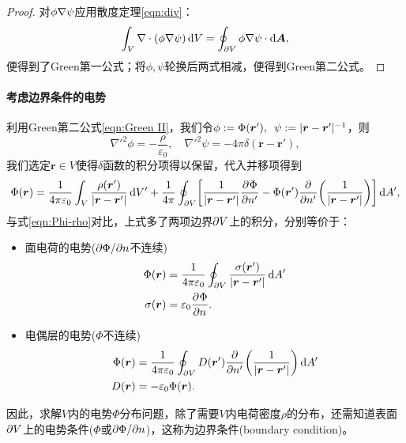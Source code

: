 \begin{proof}
    对$\phi\nabla\psi$应用散度定理\eqref{eqn:div}：
    \[
        \int_V\nabla\cdot(\phi\nabla\psi)\mathop{}\!\mathrm{d} V = \oint_{\partial V}\phi\nabla\psi \cdot \mathop{}\!\mathrm{d}\bm A,
    \]
    便得到了Green第一公式；将$\phi,\psi$轮换后两式相减，便得到Green第二公式。
\end{proof}

\paragraph{考虑边界条件的电势}

利用Green第二公式\eqref{eqn:Green II}，我们令$\phi := \Phi(\bm r'),\enspace\psi := \lvert\bm r - \bm r'\rvert^{-1}$，则
\[
    \nabla'^2\phi = -\frac{\rho}{\varepsilon_0},\quad\nabla'^2\psi = -4\pi\delta(\bm r - \bm r'),
\]
我们选定$\bm r \in V$使得$\delta$函数的积分项得以保留，代入并移项得到
\begin{equation}
    \label{eqn:Phi-rho with boundary}
        \Phi(\bm r) = \frac1{4\pi\varepsilon_0}\int_V\frac{\rho(\bm r')}{\lvert\bm r - \bm r'\rvert}\mathop{}\!\mathrm{d} V' + \frac1{4\pi}\oint_{\partial V}\biggl[\frac1{\lvert\bm r - \bm r'\rvert}\frac{\partial^{}\Phi}{\partial{n'}^{}} - \Phi(\bm r')\frac{\partial^{}}{\partial{n'}^{}}\biggl(\frac1{\lvert\bm r - \bm r'\rvert}\biggr)\biggr]\mathop{}\!\mathrm{d} A',
\end{equation}
与式\eqref{eqn:Phi-rho}对比，上式多了两项边界$\partial V$上的积分，分别等价于：
\begin{itemize}
    \item 面电荷的电势($\partial\Phi/\partial n$不连续)
    \begin{subequations}
        \begin{align}
            \Phi(\bm r) &= \frac1{4\pi\varepsilon_0}\oint_{\partial V}\frac{\sigma(\bm r')}{\lvert\bm r - \bm r'\rvert}\mathop{}\!\mathrm{d} A'\\
            \sigma(\bm r) &= \varepsilon_0\frac{\partial^{}\Phi}{\partial{n}^{}}.
        \end{align}
    \end{subequations}
    \item 电偶层的电势($\Phi$不连续)
    \begin{subequations}
        \begin{align}
            \Phi(\bm r) &= \frac1{4\pi\varepsilon_0}\oint_{\partial V}D(\bm r')\frac{\partial^{}}{\partial{n'}^{}}\biggl(\frac1{\lvert\bm r - \bm r'\rvert}\biggr)\mathop{}\!\mathrm{d} A'\\
            D(\bm r) &= -\varepsilon_0\Phi(\bm r).
        \end{align}
    \end{subequations}
\end{itemize}
因此，求解$V$内的电势$\Phi$分布问题，除了需要$V$内电荷密度$\rho$的分布，还需知道表面$\partial V$上的电势条件($\Phi$或$\partial\Phi/\partial n$)，这称为边界条件(boundary condition)。
